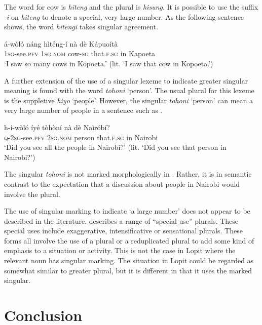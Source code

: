 \documentclass[output=paper]{langsci/langscibook}
\begin{document}
The word for cow is \textit{hiteng} and the plural is \textit{hisung}. It is possible to use the suffix \textit{{}-i} on \textit{hiteng} to denote a special, very large number. As the following sentence shows, the word \textit{hitengi} takes singular agreement.

\ea\label{ex:moodie:13}
\gll \'{a}-w\`{o}l\'{o} n\'{a}ng h\`{i}t\'{e}ng-\'{i} n\`{a} d\`{e} K\'{a}puo\'{i}t\`{a} \\
1\textsc{sg}-see.\textsc{pfv} 1\textsc{sg.nom} cow-\textsc{sg} that.\textsc{f.sg} in Kapoeta \\
\glt ‘I saw so many cows in Kopoeta.’ (lit. ‘I saw that cow in Kopoeta.’)
\z

A further extension of the use of a singular lexeme to indicate greater singular meaning is found with the word \textit{tohoni} ‘person’. The usual plural for this lexeme is the suppletive \textit{hiyo} ‘people’. However, the singular \textit{tohoni} ‘person’ can mean a very large number of people in a sentence such as .

\ea\label{ex:moodie:14}
\gll h-\'{i}-w\`{o}l\'{o} \'{i}y\'{e} t\`{o}h\`{o}n\'{i} n\`{a} d\`{e} Na\`{i}r\'{o}b\'{i}? \\
\textsc{q-2sg}-see.\textsc{pfv} 2\textsc{sg.nom} person that.\textsc{f.sg} in Nairobi \\
\glt ‘Did you see all the people in Nairobi?’ (lit. ‘Did you see that person in Nairobi?’)
\z

The singular \textit{tohoni} is not marked morphologically in . Rather, it is in semantic contrast to the expectation that a discussion about people in Nairobi would involve the plural.

The use of singular marking to indicate ‘a large number’ does not appear to be described in the literature. \citet[234]{Corbett2000} describes a range of “special use” plurals. These special uses include exaggerative, intensificative or sensational plurals. These forms all involve the use of a plural or a reduplicated plural to add some kind of emphasis to a situation or activity. This is not the case in Lopit where the relevant noun has singular marking. The situation in Lopit could be regarded as somewhat similar to greater plural, but it is different in that it uses the marked singular. 

\section{Conclusion}
\end{document}

